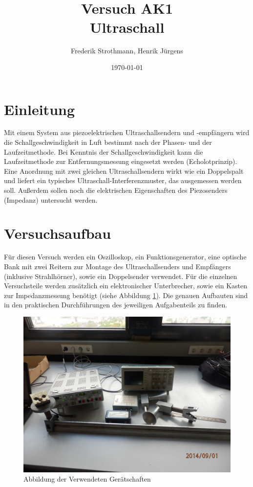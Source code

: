 \documentclass[12pt]{scrartcl}
\title{Versuch AK1\\ Ultraschall}
\author{Frederik Strothmann, Henrik Jürgens}
\date{\today}
\begin{document}

\maketitle
\newpage
\tableofcontents
\newpage


\section{Einleitung}
Mit einem System aus piezoelektrischen Ultraschallsendern und -empfängern wird die Schallgeschwindigkeit in Luft
bestimmt nach der Phasen- und der Laufzeitmethode. Bei Kenntnis der Schallgeschwindigkeit kann die Laufzeitmethode zur Entfernungsmessung eingesetzt werden (Echolotprinzip). Eine Anordnung mit zwei gleichen Ultraschallsendern wirkt wie ein Doppelspalt und liefert ein typisches
Ultraschall-Interferenzmuster, das ausgemessen werden soll.
Außerdem sollen noch die elektrischen Eigenschaften des Piezosenders (Impedanz) untersucht werden.


\section{Versuchsaufbau}
Für diesen Versuch werden ein Oszilloskop, ein Funktionsgenerator, eine optische Bank mit zwei Reitern zur Montage des Ultraschallsenders und Empfängers (inklusive Strahlhörner), sowie ein Doppelsender verwendet. Für die einzelnen Versuchsteile werden zusätzlich ein elektronischer Unterbrecher, sowie ein Kasten zur Impedanzmessung benötigt (siehe Abbildung \ref{fig:impedanz}). Die genauen Aufbauten sind in den praktischen Durchführungen des jeweiligen Aufgabenteils zu finden.

\begin{figure}[htbp] 
  \centering
    \includegraphics[scale = 0.1]{versuchsaufbau.JPG}
  	\caption[Abbildung der Verwendeten Gerätschaften]{Abbildung der Verwendeten Gerätschaften}
  \label{fig:impedanz}
\end{figure}
\end{document}
